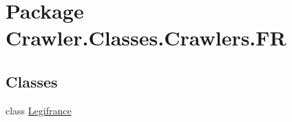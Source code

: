 \hypertarget{namespace_crawler_1_1_classes_1_1_crawlers_1_1_f_r}{\section{Package Crawler.\-Classes.\-Crawlers.\-F\-R}
\label{namespace_crawler_1_1_classes_1_1_crawlers_1_1_f_r}
}
\subsection*{Classes}
\begin{DoxyCompactItemize}
\item 
class \hyperlink{class_crawler_1_1_classes_1_1_crawlers_1_1_f_r_1_1_legifrance}{Legifrance}
\end{DoxyCompactItemize}
